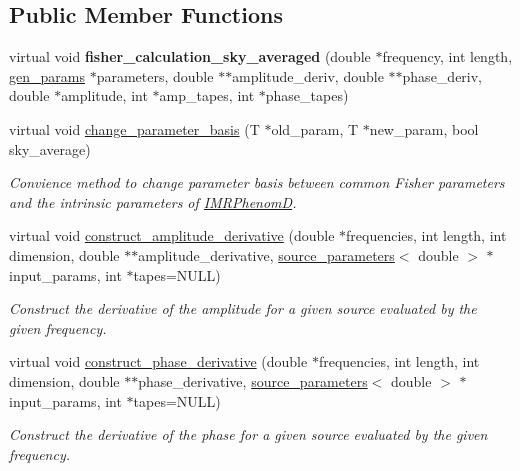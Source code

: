 \subsection*{Public Member Functions}
\begin{DoxyCompactItemize}
\item 
\mbox{\label{classIMRPhenomD_aa11b2b18790e11237a1a4f1ad1036f6e}} 
virtual void {\bfseries fisher\+\_\+calculation\+\_\+sky\+\_\+averaged} (double $\ast$frequency, int length, \hyperlink{classgen__params}{gen\+\_\+params} $\ast$parameters, double $\ast$$\ast$amplitude\+\_\+deriv, double $\ast$$\ast$phase\+\_\+deriv, double $\ast$amplitude, int $\ast$amp\+\_\+tapes, int $\ast$phase\+\_\+tapes)
\item 
virtual void \hyperlink{classIMRPhenomD_aa0e18ec42afcc215093b0c3a57580826}{change\+\_\+parameter\+\_\+basis} (T $\ast$old\+\_\+param, T $\ast$new\+\_\+param, bool sky\+\_\+average)
\begin{DoxyCompactList}\small\item\em Convience method to change parameter basis between common Fisher parameters and the intrinsic parameters of \hyperlink{classIMRPhenomD}{I\+M\+R\+PhenomD}. \end{DoxyCompactList}\item 
virtual void \hyperlink{classIMRPhenomD_a4142331cc7a6471d13274b1ac8727378}{construct\+\_\+amplitude\+\_\+derivative} (double $\ast$frequencies, int length, int dimension, double $\ast$$\ast$amplitude\+\_\+derivative, \hyperlink{structsource__parameters}{source\+\_\+parameters}$<$ double $>$ $\ast$input\+\_\+params, int $\ast$tapes=N\+U\+LL)
\begin{DoxyCompactList}\small\item\em Construct the derivative of the amplitude for a given source evaluated by the given frequency. \end{DoxyCompactList}\item 
virtual void \hyperlink{classIMRPhenomD_a26da276caf4c148016f558541d6914f6}{construct\+\_\+phase\+\_\+derivative} (double $\ast$frequencies, int length, int dimension, double $\ast$$\ast$phase\+\_\+derivative, \hyperlink{structsource__parameters}{source\+\_\+parameters}$<$ double $>$ $\ast$input\+\_\+params, int $\ast$tapes=N\+U\+LL)
\begin{DoxyCompactList}\small\item\em Construct the derivative of the phase for a given source evaluated by the given frequency. \end{DoxyCompactList}\item 

\end{DoxyCompactItemize}
